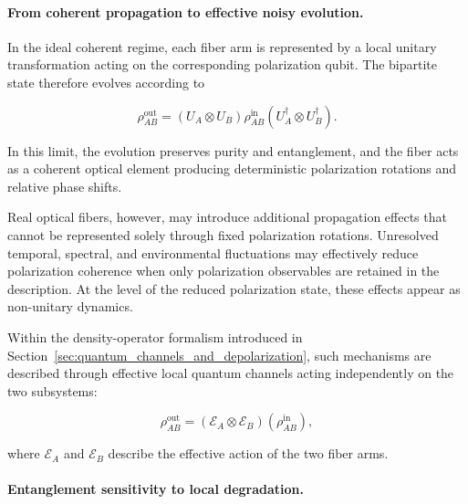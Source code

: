 \medskip

\paragraph{From coherent propagation to effective noisy evolution.}

In the ideal coherent regime, each fiber arm is represented by a local unitary transformation acting on the corresponding polarization qubit. The bipartite state therefore evolves according to

\begin{equation}
\rho_{AB}^{\mathrm{out}}
=
\left(
U_A \otimes U_B
\right)
\rho_{AB}^{\mathrm{in}}
\left(
U_A^{\dagger} \otimes U_B^{\dagger}
\right).
\label{eq:local_unitary_fiber_model_ch5}
\end{equation}

In this limit, the evolution preserves purity and entanglement, and the fiber acts as a coherent optical element producing deterministic polarization rotations and relative phase shifts.

\medskip

Real optical fibers, however, may introduce additional propagation effects that cannot be represented solely through fixed polarization rotations. Unresolved temporal, spectral, and environmental fluctuations may effectively reduce polarization coherence when only polarization observables are retained in the description. At the level of the reduced polarization state, these effects appear as non-unitary dynamics.

\medskip

Within the density-operator formalism introduced in Section~\ref{sec:quantum_channels_and_depolarization}, such mechanisms are described through effective local quantum channels acting independently on the two subsystems:

\begin{equation}
\rho_{AB}^{\mathrm{out}}
=
\left(
\mathcal{E}_A
\otimes
\mathcal{E}_B
\right)
\left(
\rho_{AB}^{\mathrm{in}}
\right),
\label{eq:local_channel_fiber_model}
\end{equation}

where \( \mathcal{E}_A \) and \( \mathcal{E}_B \) describe the effective action of the two fiber arms.

\medskip

\paragraph{Entanglement sensitivity to local degradation.}

